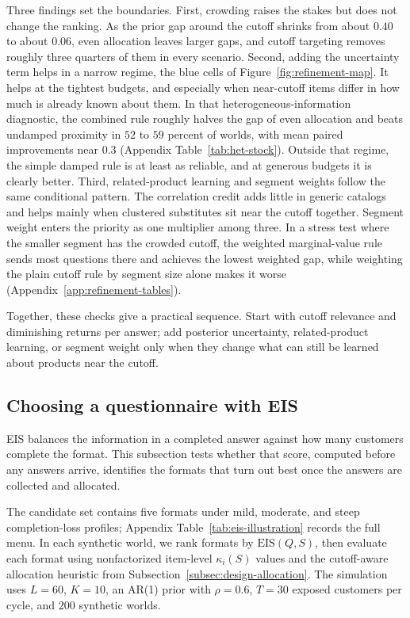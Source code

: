 \documentclass[11pt]{article}
\theoremstyle{definition}
\theoremstyle{remark}
\newcommand{\1}{\mathbf{1}}
\begin{document}
Three findings set the boundaries. First, crowding raises the stakes
but does not change the ranking. As the prior gap around the cutoff
shrinks from about \(0.40\) to about \(0.06\), even allocation
leaves larger gaps, and cutoff targeting removes roughly three
quarters of them in every scenario. Second, adding the uncertainty term helps in a narrow regime, the blue
cells of Figure~\ref{fig:refinement-map}. It helps at the tightest
budgets, and especially when near-cutoff items differ in how much is
already known about them.
In that heterogeneous-information diagnostic, the combined rule roughly
halves the gap of even allocation and beats undamped proximity in \(52\)
to \(59\) percent of worlds, with mean paired improvements near \(0.3\)
(Appendix Table~\ref{tab:het-stock}). Outside that regime, the
simple damped rule is at least as reliable, and at generous budgets it
is clearly better. Third, related-product learning and segment weights
follow the same conditional pattern. The correlation credit adds
little in generic catalogs and helps mainly when clustered substitutes
sit near the cutoff together. Segment weight enters the priority as one multiplier among three. In a stress test where the smaller
segment has the crowded cutoff, the weighted marginal-value rule sends
most questions there and achieves the lowest weighted gap, while
weighting the plain cutoff rule by segment size alone makes it worse
(Appendix~\ref{app:refinement-tables}).

Together, these checks give a practical sequence. Start with cutoff
relevance and diminishing returns per answer; add posterior uncertainty,
related-product learning, or segment weight only when they change what
can still be learned about products near the cutoff.

\subsection[Choosing a questionnaire with EIS]{Choosing a questionnaire with EIS}\label{subsec:eis-screening}

EIS balances the information in a completed answer against how many
customers complete the format. This subsection tests whether that score,
computed before any answers arrive, identifies the formats that turn out
best once the answers are collected and allocated.

The candidate set contains five formats under mild, moderate, and steep
completion-loss profiles; Appendix Table~\ref{tab:eis-illustration}
records the full menu. In each synthetic world, we rank formats
by \(\mathrm{EIS}(Q,S)\), then evaluate each format using nonfactorized
item-level \(\kappa_i(S)\) values and the cutoff-aware allocation
heuristic from Subsection~\ref{subsec:design-allocation}. The simulation
uses \(L=60\), \(K=10\), an AR(1) prior with \(\rho=0.6\), \(T=30\) exposed customers per cycle, and \(200\) synthetic worlds.
\end{document}
